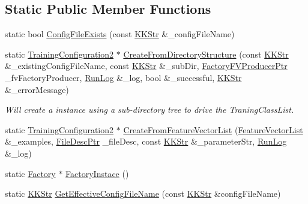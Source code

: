 \subsection*{Static Public Member Functions}
\begin{DoxyCompactItemize}
\item 
static bool \hyperlink{class_k_k_m_l_l_1_1_training_configuration2_a3e117aa7769b114dae46467fcf25fba5}{Config\+File\+Exists} (const \hyperlink{class_k_k_b_1_1_k_k_str}{K\+K\+Str} \&\+\_\+config\+File\+Name)
\item 
static \hyperlink{class_k_k_m_l_l_1_1_training_configuration2}{Training\+Configuration2} $\ast$ \hyperlink{class_k_k_m_l_l_1_1_training_configuration2_ad980f866b626b34ce8d07b8dad2562c0}{Create\+From\+Directory\+Structure} (const \hyperlink{class_k_k_b_1_1_k_k_str}{K\+K\+Str} \&\+\_\+existing\+Config\+File\+Name, const \hyperlink{class_k_k_b_1_1_k_k_str}{K\+K\+Str} \&\+\_\+sub\+Dir, \hyperlink{namespace_k_k_m_l_l_a82812d1feb85a6cff72d059bc67bb90e}{Factory\+F\+V\+Producer\+Ptr} \+\_\+fv\+Factory\+Producer, \hyperlink{class_k_k_b_1_1_run_log}{Run\+Log} \&\+\_\+log, bool \&\+\_\+successful, \hyperlink{class_k_k_b_1_1_k_k_str}{K\+K\+Str} \&\+\_\+error\+Message)
\begin{DoxyCompactList}\small\item\em Will create a instance using a sub-\/directory tree to drive the Traning\+Class\+List. \end{DoxyCompactList}\item 
static \hyperlink{class_k_k_m_l_l_1_1_training_configuration2}{Training\+Configuration2} $\ast$ \hyperlink{class_k_k_m_l_l_1_1_training_configuration2_abc62cc8215ebadbcd81f6aafdef297c2}{Create\+From\+Feature\+Vector\+List} (\hyperlink{class_k_k_m_l_l_1_1_feature_vector_list}{Feature\+Vector\+List} \&\+\_\+examples, \hyperlink{namespace_k_k_m_l_l_aa0d0b6ab4ec18868a399b8455b05d914}{File\+Desc\+Ptr} \+\_\+file\+Desc, const \hyperlink{class_k_k_b_1_1_k_k_str}{K\+K\+Str} \&\+\_\+parameter\+Str, \hyperlink{class_k_k_b_1_1_run_log}{Run\+Log} \&\+\_\+log)
\item 
static \hyperlink{class_k_k_m_l_l_1_1_training_configuration2_1_1_factory}{Factory} $\ast$ \hyperlink{class_k_k_m_l_l_1_1_training_configuration2_a3e2a4030629f233e8722065ab4756d69}{Factory\+Instace} ()
\item 
static \hyperlink{class_k_k_b_1_1_k_k_str}{K\+K\+Str} \hyperlink{class_k_k_m_l_l_1_1_training_configuration2_a1805f10e0a83f752f0d501de6c11b3c3}{Get\+Effective\+Config\+File\+Name} (const \hyperlink{class_k_k_b_1_1_k_k_str}{K\+K\+Str} \&config\+File\+Name)

\end{DoxyCompactItemize}

